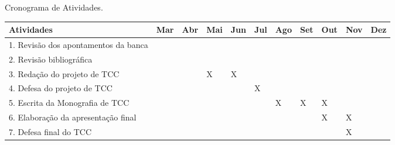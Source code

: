 \begin{quadro}[!htb]
    \caption{Cronograma de Atividades.\label{qua:quadro1}}
    \begin{tabular}{|p{4.5cm}|p{0.7cm}|p{0.7cm}|p{0.7cm}|p{0.7cm}|p{0.7cm}|p{0.7cm}|p{0.7cm}|p{0.7cm}|p{0.7cm}|p{0.7cm}|}
        \hline
        \textbf{Atividades} & \textbf{Mar} & \textbf{Abr} & \textbf{Mai} & \textbf{Jun} & \textbf{Jul} & \textbf{Ago} & \textbf{Set} & \textbf{Out} & \textbf{Nov} & \textbf{Dez} \\
        \hline
        \small{1. Revisão dos apontamentos da banca} &   &   &   &   &   &   &   &   &   &  \\
        \hline
        \small{2. Revisão bibliográfica} &   &   &   &   &   &   &   &   &   &  \\
        \hline
	\small{3. Redação do projeto de TCC} &   &   & X & X &   &   &   &   &   &  \\
        \hline
	\small{4. Defesa do projeto de TCC} &   &   &   &   & X &   &   &   &   &  \\
        \hline
	\small{5. Escrita da Monografia de TCC} &   &   &   &   &   & X & X  & X &   &  \\
        \hline
	\small{6. Elaboração da apresentação final} &   &   &   &   &   &   &   & X & X &  \\
        \hline
	\small{7. Defesa final do TCC} &   &   &   &   &   &   &   &   & X &  \\
        \hline
    \end{tabular}
\end{quadro}